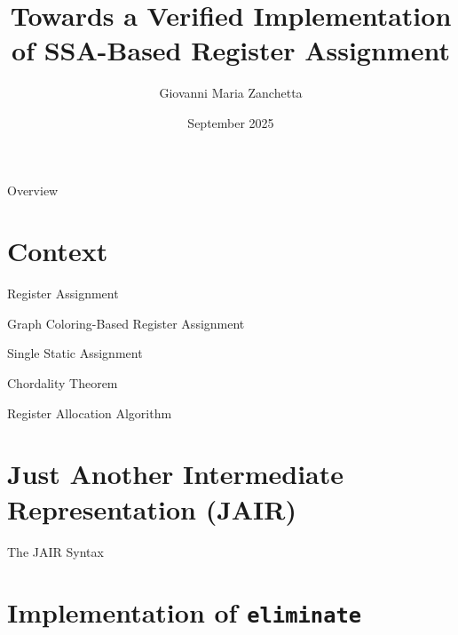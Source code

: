 \documentclass[aspectratio=169,xcolor=dvipsnames]{beamer}
\title{Towards a Verified Implementation of SSA-Based Register Assignment}
\author{Giovanni Maria Zanchetta}
\institute
{
    Advisor: Prof. Marco Patrignani \\
    Co-Advisor: Matthis Kruse \\
}
\date{September 2025}
\begin{document}
\begin{frame}
    \titlepage
\end{frame}

\begin{frame}{Overview}
    \tableofcontents
\end{frame}

\section{Context}
\begin{frame}{Register Assignment}

\end{frame}

\begin{frame}{Graph Coloring-Based Register Assignment}

\end{frame}

\begin{frame}{Single Static Assignment}

\end{frame}

\begin{frame}{Chordality Theorem}

\end{frame}

\begin{frame}{Register Allocation Algorithm}

\end{frame}

\section{Just Another Intermediate Representation (JAIR)}

\begin{frame}{The JAIR Syntax}

\end{frame}

\section{Implementation of \texttt{eliminate}}
\end{document}
